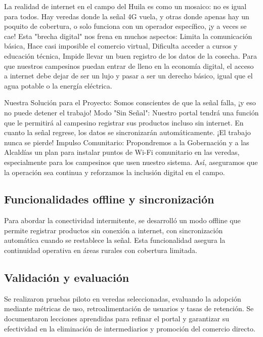 La realidad de internet en el campo del Huila es como un mosaico: no es igual para todos. Hay veredas donde la señal 4G vuela, y otras donde apenas hay un poquito de cobertura, o solo funciona con un operador específico, ¡y a veces se cae! Esta "brecha digital" nos frena en muchos aspectos: Limita la comunicación básica, Hace casi imposible el comercio virtual, Dificulta acceder a cursos y educación técnica, Impide llevar un buen registro de los datos de la cosecha. Para que nuestros campesinos puedan entrar de lleno en la economía digital, el acceso a internet debe dejar de ser un lujo y pasar a ser un derecho básico, igual que el agua potable o la energía eléctrica.

Nuestra Solución para el Proyecto: Somos conscientes de que la señal falla, ¡y eso no puede detener el trabajo! Modo "Sin Señal": Nuestro portal tendrá una función que le permitirá al campesino registrar sus productos incluso sin internet. En cuanto la señal regrese, los datos se sincronizarán automáticamente. ¡El trabajo nunca se pierde! Impulso Comunitario: Propondremos a la Gobernación y a las Alcaldías un plan para instalar puntos de Wi-Fi comunitario en las veredas, especialmente para los campesinos que usen nuestro sistema. Así, aseguramos que la operación sea continua y reforzamos la inclusión digital en el campo.

\subsection{Funcionalidades offline y sincronización}
Para abordar la conectividad intermitente, se desarrolló un modo offline que permite registrar productos sin conexión a internet, con sincronización automática cuando se restablece la señal. Esta funcionalidad asegura la continuidad operativa en áreas rurales con cobertura limitada.

\subsection{Validación y evaluación}
Se realizaron pruebas piloto en veredas seleccionadas, evaluando la adopción mediante métricas de uso, retroalimentación de usuarios y tasas de retención. Se documentaron lecciones aprendidas para refinar el portal y garantizar su efectividad en la eliminación de intermediarios y promoción del comercio directo.